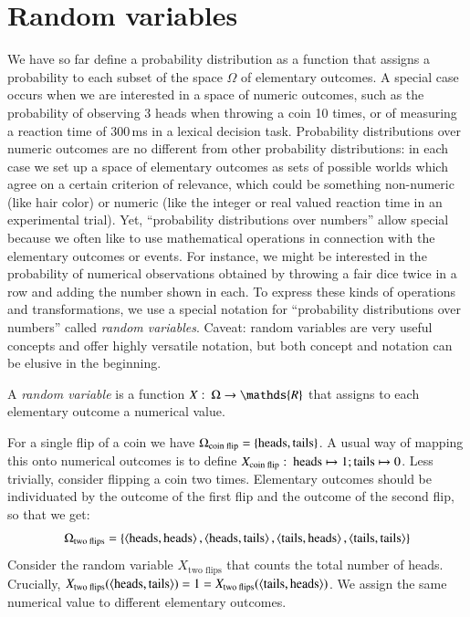 \documentclass[nobib,nofonts]{tufte-handout}
\renewcommand{\markdef}[1]{\emph{#1}}
\begin{document}
\newpage

\section{Random variables}

We have so far define a probability distribution as a function that assigns a probability to
each subset of the space $\Omega$ of elementary outcomes.
A special case occurs when we are interested in a space of numeric outcomes, such as the probability of observing 3 heads when throwing a coin 10 times, or of measuring a reaction time of 300\,ms in a lexical decision task.
Probability distributions over numeric outcomes are no different from other probability distributions: in each case we set up a space of elementary outcomes as sets of possible worlds which agree on a certain criterion of relevance, which could be something non-numeric (like hair color) or numeric (like the integer or real valued reaction time in an experimental trial).
Yet, ``probability distributions over numbers'' allow special because we often like to use mathematical operations in connection with the elementary outcomes or events.
For instance, we might be interested in the probability of numerical observations obtained by throwing a fair dice twice in a row and adding the number shown in each.
To express these kinds of operations and transformations, we use a special notation for ``probability distributions over numbers'' called \emph{random variables}.
Caveat: random variables are very useful concepts and offer highly versatile notation, but both concept and notation can be elusive in the beginning.

A \markdef{random variable} is a function $X \mycolon \Omega \rightarrow \mathds{R}$ that
assigns to each elementary outcome a numerical value.

\begin{example}
  \label{example:single-coin-RV}
  For a single flip of a coin we have $\Omega_{\text{coin flip}} =
  \left\{\text{heads}, \text{tails}\right\}$. A usual way of mapping this onto numerical outcomes is to
  define $X_{\text{coin flip}} \thinspace \colon \thinspace \text{heads} \mapsto 1; \text{tails} \mapsto 0$. Less trivially, consider
  flipping a coin two times. Elementary outcomes should be individuated by the outcome of the
  first flip and the outcome of the second flip, so that we get:
  \begin{align*}
    \Omega_{\text{two flips}} = \left\{\left \langle \text{heads}, \text{heads}\right\rangle, \left \langle \text{heads}, \text{tails}\right\rangle,
    \left \langle \text{tails}, \text{heads}\right\rangle, \left \langle \text{tails}, \text{tails}\right\rangle\right\}
  \end{align*}
  Consider the random variable $X_{\text{two flips}}$ that counts the
  total number of heads. Crucially,
  $X_{\text{two flips}}(\left \langle \text{heads}, \text{tails}\right\rangle) = 1 = X_{\text{two
      flips}}(\left \langle \text{tails}, \text{heads}\right\rangle)$. We assign the same numerical value to
  different elementary outcomes.
\end{example}
\end{document}
